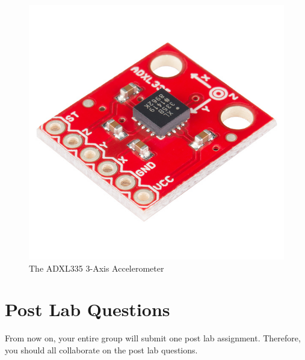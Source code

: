 \documentclass[12pt]{article}
\begin{document}
	\begin{figure}[h!]
		\begin{center}
			\includegraphics[scale=0.75]{Figures/ADXL335.jpg}
			\caption{The ADXL335 3-Axis Accelerometer}
		\end{center}
	\end{figure}

	\section*{Post Lab Questions}
	From now on, your entire group will submit one post lab assignment. Therefore, you should all collaborate on the post lab questions.
	
\end{document}
